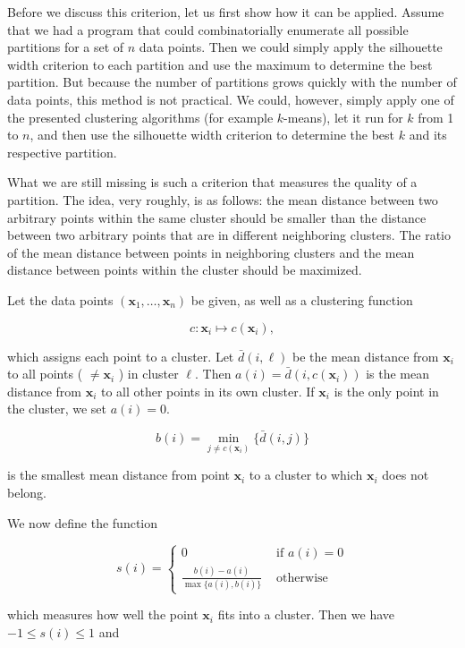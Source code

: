 \documentclass[10pt]{article}
\begin{document}
Before we discuss this criterion, let us first show how it can be applied. Assume that we had a program that could combinatorially enumerate all possible partitions for a set of $n$ data points. Then we could simply apply the silhouette width criterion to each partition and use the maximum to determine the best partition. But because the number of partitions grows quickly with the number of data points, this method is not practical. We could, however, simply apply one of the presented clustering algorithms (for example $k$-means), let it run for $k$ from 1 to $n$, and then use the silhouette width criterion to determine the best $k$ and its respective partition.

What we are still missing is such a criterion that measures the quality of a partition. The idea, very roughly, is as follows: the mean distance between two arbitrary points within the same cluster should be smaller than the distance between two arbitrary points that are in different neighboring clusters. The ratio of the mean distance between points in neighboring clusters and the mean distance between points within the cluster should be maximized.

Let the data points $\left(\boldsymbol{x}_{1}, \ldots, \boldsymbol{x}_{n}\right)$ be given, as well as a clustering function

$$
c: \boldsymbol{x}_{i} \mapsto c\left(\boldsymbol{x}_{i}\right),
$$

which assigns each point to a cluster. Let $\bar{d}(i, \ell)$ be the mean distance from $\boldsymbol{x}_{i}$ to all points ( $\neq \boldsymbol{x}_{i}$ ) in cluster $\ell$. Then $a(i)=\bar{d}\left(i, c\left(\boldsymbol{x}_{i}\right)\right)$ is the mean distance from $\boldsymbol{x}_{i}$ to all other points in its own cluster. If $\boldsymbol{x}_{i}$ is the only point in the cluster, we set $a(i)=0$.

$$
b(i)=\min _{j \neq c\left(\boldsymbol{x}_{i}\right)}\{\bar{d}(i, j)\}
$$

is the smallest mean distance from point $\boldsymbol{x}_{i}$ to a cluster to which $\boldsymbol{x}_{i}$ does not belong.

We now define the function

$$
s(i)=\left\{\begin{array}{cc}
0 & \text { if } a(i)=0 \\
\frac{b(i)-a(i)}{\max \{a(i), b(i)\}} & \text { otherwise }
\end{array}\right.
$$

which measures how well the point $\boldsymbol{x}_{i}$ fits into a cluster. Then we have $-1 \leq s(i) \leq 1$ and
\end{document}
